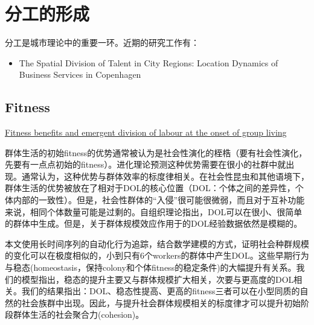 \chapter{分工的形成}

分工是城市理论中的重要一环。近期的研究工作有：

\begin{itemize}
    \item  The Spatial Division of Talent in City Regions: Location Dynamics of Business Services in Copenhagen
\end{itemize}

\section{Fitness}

\href{https://www.nature.com/articles/s41586-018-0422-6}{Fitness benefits and emergent division of labour at the onset of group living}

群体生活的初始fitness的优势通常被认为是社会性演化的桎梏（要有社会性演化，先要有一点点初始的fitness）。进化理论预测这种优势需要在很小的社群中就出现。通常认为，这种优势与群体效率的标度律相关。在社会性昆虫和其他语境下，群体生活的优势被放在了相对于DOL的核心位置（DOL：个体之间的差异性，个体内部的一致性）。但是，社会性群体的“入侵”很可能很微弱，而且对于互补功能来说，相同个体数量可能是过剩的。自组织理论指出，DOL可以在很小、很简单的群体中生成。但是，关于群体规模效应作用于的DOL经验数据依然是模糊的。

本文使用长时间序列的自动化行为追踪，结合数学建模的方式，证明社会种群规模的变化可以在极度相似的，小到只有6个workers的群体中产生DOL。这些早期行为与稳态(homeostasis，保持colony和个体fitness的稳定条件)的大幅提升有关系。我们的模型指出，稳态的提升主要又与群体规模扩大相关，次要与更高度的DOL相关。我们的结果指出：DOL、稳态性提高、更高的fitness三者可以在小型同质的自然的社会族群中出现。因此，与提升社会群体规模相关的标度律才可以提升初始阶段群体生活的社会聚合力(cohesion)。